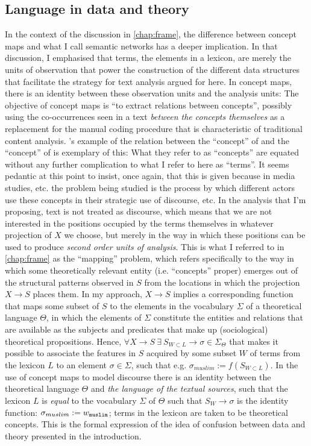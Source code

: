 \subsection{Language in data and theory}
\label{subsec:lang}

In the context of the discussion in \autoref{chap:frame}, the difference between concept maps and what I call semantic networks
has a deeper implication.
In that discussion, I emphasised that terms, the elements in a lexicon, are merely the units of observation that power the construction of the different data structures that facilitate the strategy for text analysis argued for here.
In concept maps, there is an identity between these observation units and the analysis units:
The objective of concept maps is ``to extract relations between concepts'', possibly using the co-occurrences seen in a text \emph{between the concepts themselves} as a replacement for the manual coding procedure that is characteristic of traditional content analysis.
\citeauthor{vanatteveldt2008}'s example of the relation between the ``concept'' of  and the ``concept'' of  is exemplary of this: What they refer to as ``concepts'' are equated without any further complication to what I refer to here as ``terms''.
It seems pedantic at this point to insist, once again, that this is given because in media studies, etc. the problem being studied is the process by which different actors use these concepts in their strategic use of discourse, etc.
In the analysis that I'm proposing, text is not treated as discourse, which means that we are not interested in the positions occupied by the terms themselves in whatever projection of $X$ we choose, but merely in the way in which these positions can be used to produce \emph{second order units of analysis}.
This is what I referred to in \autoref{chap:frame} as the ``mapping'' problem, which refers specifically to the way in which some theoretically relevant entity (i.e. ``concepts'' proper) emerges out of the structural patterns observed in $S$ from the locations in which the projection $X \rightarrow S$ places them.
In my approach, $X \rightarrow S$ implies a corresponding function that maps some subset of $S$ to the elements in the vocabulary $\Sigma$ of a theoretical language $\Theta$, in which the elements of $\Sigma$ constitute the entities and relations that are available as the subjects and predicates that make up (sociological) theoretical propositions.
Hence, $\forall X \rightarrow S \: \exists \: S_{W \subset L} \rightarrow \sigma \in \Sigma_{\Theta}$ that makes it possible to associate the features in $S$ acquired by some subset $W$ of terms from the lexicon $L$ to an element $\sigma \in \Sigma$, such that e.g. $\sigma_{muslim} := f(S_{W \subset L})$.
In the use of concept maps to model discourse there is an identity between the theoretical language $\Theta$ and \emph{the language of the textual sources}, such that the lexicon $L$ is \emph{equal} to the vocabulary $\Sigma$ of $\Theta$ such that $S_{W} \rightarrow \sigma$ is the identity function: $\sigma_{muslim} := w_{\texttt{muslim}}$; terms in the lexicon are taken to be theoretical concepts.
This is the formal expression of the idea of confusion between data and theory presented in the introduction.

